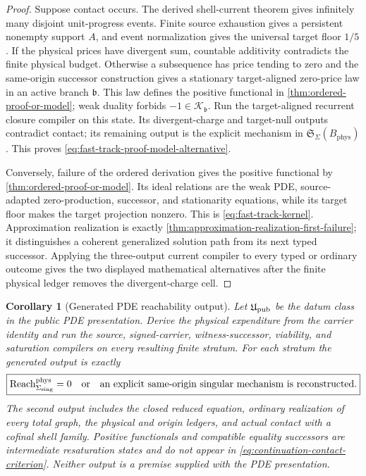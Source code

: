 \documentclass[11pt]{article}
\numberwithin{section}{part}
\theoremstyle{plain}
\newtheorem{corollary}[corollary]{Corollary}
\theoremstyle{definition}
\theoremstyle{remark}
\newcommand{\Reach}{\operatorname{Reach}}
\newcommand{\Phys}{\mathrm{phys}}
\newcommand{\Budget}{B_{\Phys}}
\begin{document}
\begin{proof}
Suppose contact occurs.  The derived shell-current theorem gives infinitely
many disjoint unit-progress events.  Finite source exhaustion gives a
persistent nonempty support \(A\), and event normalization gives the universal
target floor \(1/5\).  If the physical prices have
divergent sum, countable additivity contradicts the finite physical budget.
Otherwise a subsequence has price tending to zero and the same-origin
successor construction gives a stationary target-aligned zero-price law in
an active branch \(\mathfrak b\).  This law defines the positive functional in
\cref{thm:ordered-proof-or-model}; weak duality forbids
\(-1\in\mathcal K_{\mathfrak b}\).  Run the target-aligned recurrent closure
compiler on this state.  Its divergent-charge and target-null outputs
contradict contact; its remaining output is the explicit mechanism in
\(\mathfrak S_\Sigma(\Budget)\).  This proves
\eqref{eq:fast-track-proof-model-alternative}.

Conversely, failure of the ordered derivation gives the positive functional
by \cref{thm:ordered-proof-or-model}.  Its ideal relations are the weak PDE,
source-adapted zero-production, successor, and stationarity equations, while
its target floor makes the target projection nonzero.  This is
\eqref{eq:fast-track-kernel}.  Approximation realization is exactly
\cref{thm:approximation-realization-first-failure}; it distinguishes a
coherent generalized solution path from its next typed successor.
Applying the three-output current compiler to every typed or ordinary outcome
gives the two displayed mathematical alternatives after the finite physical
ledger removes the divergent-charge cell.
\end{proof}

\begin{corollary}[Generated PDE reachability output]
\label{cor:pde-target-reachability}
Let \(\mathfrak U_{\rm pub}\) be the datum class in the public PDE
presentation.  Derive the physical expenditure from the carrier identity and
run the source, signed-carrier, witness-successor, viability, and saturation
compilers on every resulting finite stratum.  For each stratum the generated
output is exactly
\begin{equation}
 \label{eq:continuation-contact-criterion}
 \boxed{
 \Reach_{\Sigma_{\rm sing}}^{\Phys}=0
 \quad\text{or}\quad
 \text{an explicit same-origin singular mechanism is reconstructed}.}
\end{equation}
The second output includes the closed reduced equation, ordinary realization
of every total graph, the physical and origin ledgers, and actual contact with
a cofinal shell family.  Positive functionals and compatible equality
successors are intermediate resaturation states and do not appear in
\eqref{eq:continuation-contact-criterion}.  Neither output is a premise
supplied with the PDE presentation.
\end{corollary}
\end{document}
